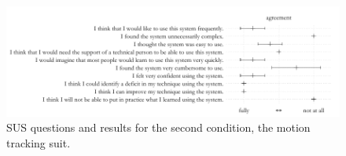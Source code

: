 \begin{figure}[h]
    \centering
    \includegraphics[width=\textwidth]{figures/plots/sus-mvn.pdf}
    \caption{SUS questions and results for the second condition, the motion tracking suit.}
    \label{fig:sus-glasses}
\end{figure}

